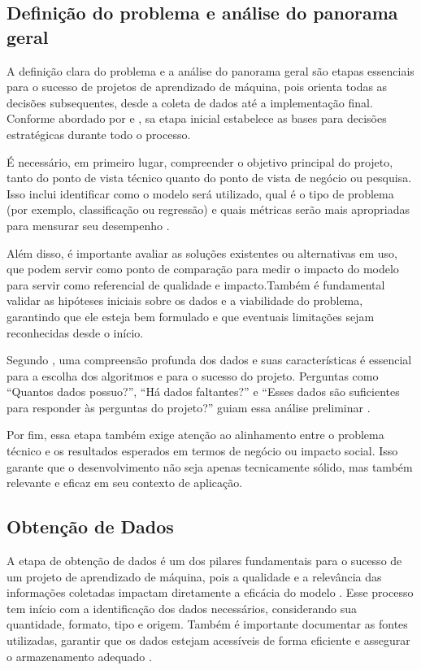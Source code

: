 \subsection{Definição do problema e análise do panorama geral}
A definição clara do problema e a análise do panorama geral são etapas essenciais para o sucesso de projetos de aprendizado de máquina, pois orienta todas as decisões subsequentes, desde a coleta de dados até a implementação final. Conforme abordado por  e , sa etapa inicial estabelece as bases para decisões estratégicas durante todo o processo.  

É necessário, em primeiro lugar, compreender o objetivo principal do projeto, tanto do ponto de vista técnico quanto do ponto de vista de negócio ou pesquisa. Isso inclui identificar como o modelo será utilizado, qual é o tipo de problema (por exemplo, classificação ou regressão) e quais métricas serão mais apropriadas para mensurar seu desempenho \cite{geron2017}.

Além disso, é importante avaliar as soluções existentes ou alternativas em uso, que podem servir como ponto de comparação para medir o impacto do modelo para servir como referencial de qualidade e impacto.Também é fundamental validar as hipóteses iniciais sobre os dados e a viabilidade do problema, garantindo que ele esteja bem formulado e que eventuais limitações sejam reconhecidas desde o início.

Segundo , uma compreensão profunda dos dados e suas características é essencial para a escolha dos algoritmos e para o sucesso do projeto. Perguntas como “Quantos dados possuo?”, “Há dados faltantes?” e “Esses dados são suficientes para responder às perguntas do projeto?” guiam essa análise preliminar \cite{muller2017}.

Por fim, essa etapa também exige atenção ao alinhamento entre o problema técnico e os resultados esperados em termos de negócio ou impacto social. Isso garante que o desenvolvimento não seja apenas tecnicamente sólido, mas também relevante e eficaz em seu contexto de aplicação.

\subsection{Obtenção de Dados}
A etapa de obtenção de dados é um dos pilares fundamentais para o sucesso de um projeto de aprendizado de máquina, pois a qualidade e a relevância das informações coletadas impactam diretamente a eficácia do modelo \cite{geron2017}. Esse processo tem início com a identificação dos dados necessários, considerando sua quantidade, formato, tipo e origem. Também é importante documentar as fontes utilizadas, garantir que os dados estejam acessíveis de forma eficiente e assegurar o armazenamento adequado \cite{geron2017}.

